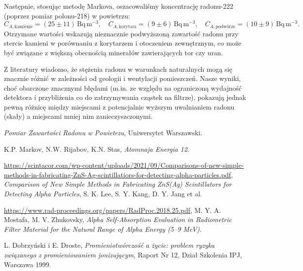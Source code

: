\documentclass[12pt]{article}
\begin{document}
Następnie, stosując metodę Markova, oszacowaliśmy koncentrację radonu-222 (poprzez pomiar polonu-218) w powietrzu: 
\[
C_{A,\text{kamienie}}=(25 \pm 11)\,\mathrm{Bq\,m^{-3}}, 
\quad
C_{A,\text{korytarz}}=(9 \pm 6)\,\mathrm{Bq\,m^{-3}}, 
\quad
C_{A,\text{podwórze}}=(10 \pm 9)\,\mathrm{Bq\,m^{-3}}.
\]
Otrzymane wartości wskazują nieznacznie podwyższoną zawartość radonu przy stercie kamieni w porównaniu z korytarzem i otoczeniem zewnętrznym, co może być związane z większą obecnością minerałów zawierających tor czy uran. 

Z literatury \cite{concentration} wiadomo, że stężenia radonu w warunkach naturalnych mogą się znacznie różnić w zależności od geologii i wentylacji pomieszczeń. Nasze wyniki, choć obarczone znacznymi błędami (m.in. ze względu na ograniczoną wydajność detektora i przybliżenia co do zatrzymywania cząstek na filtrze), pokazują jednak pewną różnicę między miejscami z potencjalnie wyższym uwalnianiem radonu (skały) a miejscami mniej nim zanieczyszczonymi.

\newpage

\begin{thebibliography}{5}

	\emph{Pomiar Zawartości Radonu w Powietrzu}, Uniwersytet Warszawski.

	K.P. Markov, N.W. Rijabov, K.N. Stas, \emph{Atomnaja Energia 12}.

	\url{https://scintacor.com/wp-content/uploads/2021/09/Comparisons-of-new-simple-methods-in-fabricating-ZnS-Ag-scintillatiors-for-detecting-alpha-particles.pdf},
	\emph{Comparison of New Simple Methods in Fabricating ZnS(Ag) Scintillators for Detecting Alpha Particles}, 
	S. K. Lee, S. Y. Kang, D. Y. Jang et al.

	\url{https://www.rad-proceedings.org/papers/RadProc.2018.25.pdf},
	M. Y. A. Mostafa, M. V. Zhukovsky, \emph{Alpha Self-Absorption Evaluation in Radiometric Filter Material for the Natural Range of Alpha Energy (5–9 MeV)}.

	L. Dobrzyński i E. Droste, \emph{Promieniotwórczość a życie: problem ryzyka związanego z promieniowaniem jonizującym}, Raport Nr 12, Dział Szkolenia IPJ, Warszawa 1999.

\end{thebibliography}
\end{document}
